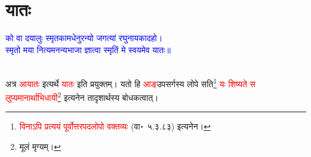 \section[यातः]{यातः}
\centering\textcolor{blue}{को वा दयालुः स्मृतकामधेनुरन्यो जगत्यां रघुनायकादहो।\nopagebreak\\
स्मृतो मया नित्यमनन्यभाजा ज्ञात्वा स्मृतिं मे स्वयमेव यातः॥}\nopagebreak\\
\\
\begin{sloppypar}\justifying\noindent\hspace{10mm} अत्र \textcolor{red}{आयातः} इत्यर्थे \textcolor{red}{यातः} इति प्रयुक्तम्। यतो हि \textcolor{red}{आङ्‌}\-उपसर्गस्य लोपे सति\footnote{\textcolor{red}{विनाऽपि प्रत्ययं पूर्वोत्तर\-पद\-लोपो वक्तव्यः} (वा॰~५.३.८३) इत्यनेन।} \textcolor{red}{यः शिष्यते स लुप्यमानार्थाभिधायी}\footnote{मूलं मृग्यम्।} इत्यनेन तादृशार्थस्य बोधकत्वात्।\end{sloppypar}
